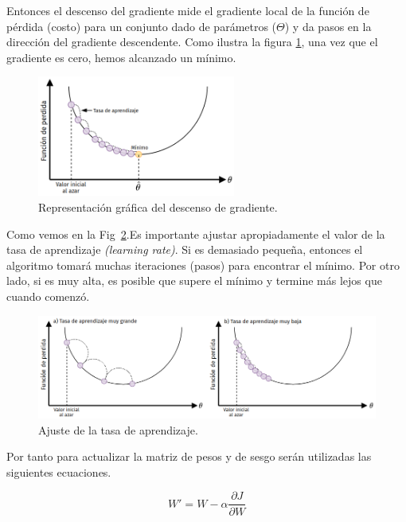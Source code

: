 \documentclass[a4paper,12pt]{article}
\begin{document}
Entonces el descenso del gradiente mide el gradiente local de la función de pérdida (costo) para un conjunto dado de parámetros ($\Theta$) y da pasos en la dirección del gradiente descendente. Como ilustra la figura \ref{fig:gd}, una vez que el gradiente es cero, hemos alcanzado un mínimo.

\begin{figure}[H]
	\begin{center}				
		\includegraphics[width=0.58\textwidth]{023.png}
		\caption{Representación gráfica del descenso de gradiente.}
		\label{fig:gd}
	\end{center}
\end{figure}

Como vemos en la Fig~\ref{fig:lr}.Es importante ajustar apropiadamente el valor de la tasa de aprendizaje \textit{(learning rate)}. Si es demasiado pequeña, entonces el algoritmo tomará muchas iteraciones (pasos) para encontrar el mínimo. Por otro lado, si es muy alta, es posible que supere el mínimo y termine más lejos que cuando comenzó.

\begin{figure}[H]
	\begin{center}				
		\includegraphics[width=1\textwidth]{tesis_37.png}
		\caption{Ajuste de la tasa de aprendizaje.}
		\label{fig:lr}
	\end{center}
\end{figure}

Por tanto para actualizar la matriz de pesos y de sesgo serán utilizadas las siguientes ecuaciones.

\begin{equation}
	W' = W - \alpha \frac{\partial J}{\partial W}
\end{equation}
\end{document}
